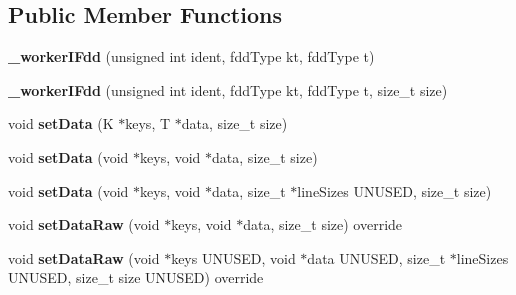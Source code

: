 \subsection*{Public Member Functions}
\begin{DoxyCompactItemize}
\item 
\hypertarget{classfaster_1_1__workerIFdd_a08037ef118ef3e86a3b1926f4d11d443}{}{\bfseries \+\_\+worker\+I\+Fdd} (unsigned int ident, fdd\+Type kt, fdd\+Type t)\label{classfaster_1_1__workerIFdd_a08037ef118ef3e86a3b1926f4d11d443}

\item 
\hypertarget{classfaster_1_1__workerIFdd_a310dd5f9799da46d3fecf15c917a5b46}{}{\bfseries \+\_\+worker\+I\+Fdd} (unsigned int ident, fdd\+Type kt, fdd\+Type t, size\+\_\+t size)\label{classfaster_1_1__workerIFdd_a310dd5f9799da46d3fecf15c917a5b46}

\item 
\hypertarget{classfaster_1_1__workerIFdd_a7c25eaec0cb983ca8d3891886f4d2e3e}{}void {\bfseries set\+Data} (K $\ast$keys, T $\ast$data, size\+\_\+t size)\label{classfaster_1_1__workerIFdd_a7c25eaec0cb983ca8d3891886f4d2e3e}

\item 
\hypertarget{classfaster_1_1__workerIFdd_a72512bdb22ef328a7eaa98af26c637c9}{}void {\bfseries set\+Data} (void $\ast$keys, void $\ast$data, size\+\_\+t size)\label{classfaster_1_1__workerIFdd_a72512bdb22ef328a7eaa98af26c637c9}

\item 
\hypertarget{classfaster_1_1__workerIFdd_a612ec6f32a16bb384b353f06063573c0}{}void {\bfseries set\+Data} (void $\ast$keys, void $\ast$data, size\+\_\+t $\ast$line\+Sizes U\+N\+U\+S\+E\+D, size\+\_\+t size)\label{classfaster_1_1__workerIFdd_a612ec6f32a16bb384b353f06063573c0}

\item 
\hypertarget{classfaster_1_1__workerIFdd_afe2037df84a871a1d1971295460de648}{}void {\bfseries set\+Data\+Raw} (void $\ast$keys, void $\ast$data, size\+\_\+t size) override\label{classfaster_1_1__workerIFdd_afe2037df84a871a1d1971295460de648}

\item 
\hypertarget{classfaster_1_1__workerIFdd_ae8acb90658c5051a34a71bc03e43bf1e}{}void {\bfseries set\+Data\+Raw} (void $\ast$keys U\+N\+U\+S\+E\+D, void $\ast$data U\+N\+U\+S\+E\+D, size\+\_\+t $\ast$line\+Sizes U\+N\+U\+S\+E\+D, size\+\_\+t size U\+N\+U\+S\+E\+D) override\label{classfaster_1_1__workerIFdd_ae8acb90658c5051a34a71bc03e43bf1e}


\end{DoxyCompactItemize}
